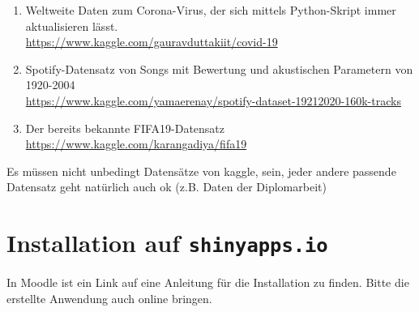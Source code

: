 \documentclass{article}
\begin{document}
\begin{enumerate}
	\item Weltweite Daten zum Corona-Virus, der sich mittels Python-Skript immer aktualisieren lässt. \\ \url{https://www.kaggle.com/gauravduttakiit/covid-19}
	\item Spotify-Datensatz von Songs mit Bewertung und akustischen Parametern von 1920-2004 \\
	\url{https://www.kaggle.com/yamaerenay/spotify-dataset-19212020-160k-tracks} 
	\item Der bereits bekannte FIFA19-Datensatz \\
	\url{https://www.kaggle.com/karangadiya/fifa19}
\end{enumerate}

Es müssen nicht unbedingt Datensätze von kaggle, sein, jeder andere passende Datensatz geht natürlich auch ok (z.B. Daten der Diplomarbeit)

\section{Installation auf \texttt{shinyapps.io}}

In Moodle ist ein Link auf eine Anleitung für die Installation zu finden. Bitte die erstellte Anwendung auch online bringen.
\end{document}
